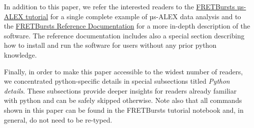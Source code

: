 In addition to this paper, we refer the interested readers to the
\href{http://nbviewer.ipython.org/github/tritemio/FRETBursts_notebooks/blob/master/notebooks/FRETBursts\%20-\%20us-ALEX\%20smFRET\%20burst\%20analysis.ipynb}{FRETBursts µs-ALEX tutorial}
for a single complete example of µs-ALEX data analysis and to the
\href{http://fretbursts.readthedocs.org/}{FRETBursts Reference Documentation}
for a more in-depth description of the software. The reference documentation
includes also a special section describing how to install and run the software
for users without any prior python knowledge.

Finally, in order to make this paper accessible to the widest number of readers,
we concentrated python-specific details in special subsections titled
\textit{Python details}. These subsections provide deeper insights for readers
already familiar with python and can be safely skipped otherwise. Note also
that all commands shown in this paper can be found in the FRETBursts tutorial notebook
and, in general, do not need to be re-typed.

